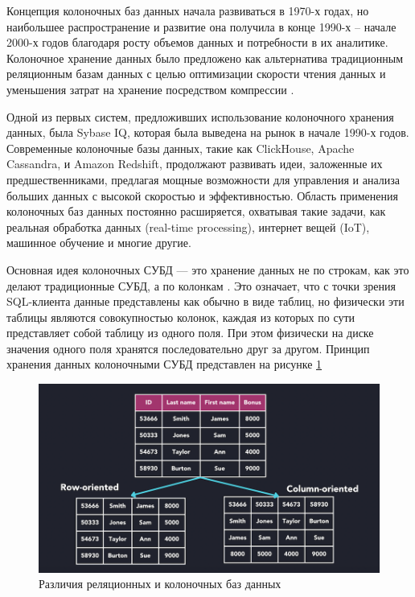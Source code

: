 \documentclass[14pt, russian]{scrartcl}
\begin{document}
Концепция колоночных баз данных начала развиваться в 1970-х годах, но наибольшее распространение и развитие она получила в конце 1990-х – начале 2000-х годов благодаря росту объемов данных и потребности в их аналитике. Колоночное хранение данных было предложено как альтернатива традиционным реляционным базам данных с целью оптимизации скорости чтения данных и уменьшения затрат на хранение посредством компрессии \cite{Kabanchik}.

Одной из первых систем, предложивших использование колоночного хранения данных, была Sybase IQ, которая была выведена на рынок в начале 1990-х годов.
Современные колоночные базы данных, такие как ClickHouse, Apache Cassandra, и Amazon Redshift, продолжают развивать идеи, заложенные их предшественниками, предлагая мощные возможности для управления и анализа больших данных с высокой скоростью и эффективностью. Область применения колоночных баз данных постоянно расширяется, охватывая такие задачи, как реальная обработка данных (real-time processing), интернет вещей (IoT), машинное обучение и многие другие.

Основная идея колоночных СУБД — это хранение данных не по строкам, как это делают традиционные СУБД, а по колонкам . Это означает, что с точки зрения SQL-клиента данные представлены как обычно в виде таблиц, но физически эти таблицы являются совокупностью колонок, каждая из которых по сути представляет собой таблицу из одного поля. При этом физически на диске значения одного поля хранятся последовательно друг за другом. Принцип хранения данных колоночными СУБД представлен на рисунке \ref{fig:columnarvsrelational}

\begin{figure}[H]
	\centering
	\begin{minipage}[t]{.9\textwidth}
		\centering
		\includegraphics[width=.7\textwidth]{./imgs/columnar-database.png}
	\end{minipage}
	\caption{Различия реляционных и колоночных баз данных}
	\label{fig:columnarvsrelational}
\end{figure}
\end{document}
